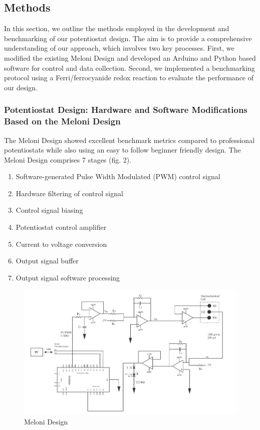 \documentclass{article}
\begin{document}
\subsection*{Methods}


In this section, we outline the methods employed in the development and benchmarking of our potentiostat design. The aim is to provide a comprehensive understanding of our approach, which involves two key processes. First, we modified the existing Meloni Design and developed an Arduino and Python based software for control and data collection. Second, we implemented a benchmarking protocol using a Ferri/ferrocyanide redox reaction to evaluate the performance of our design.


\subsubsection*{Potentiostat Design: Hardware and Software Modifications Based on the Meloni Design}


The Meloni Design showed excellent benchmark metrics compared to professional potentiostats while also using an easy to follow beginner friendly design. The Meloni Design comprises 7 stages (fig. 2).
\begin{enumerate}
\item Software-generated Pulse Width Modulated (PWM) control signal
\item Hardware filtering of control signal
\item Control signal biasing
\item Potentiostat control amplifier
\item Current to voltage conversion
\item Output signal buffer
\item Output signal software processing
\end{enumerate}


\begin{figure}[H]
\centering
\includegraphics[width=.9\linewidth]{meloni_design.png}
\caption{Meloni Design}
\end{figure}
\end{document}
